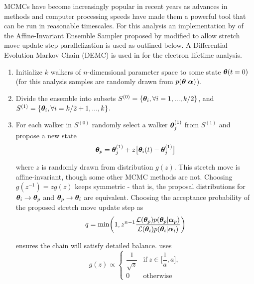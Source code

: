 MCMCs have become increasingly popular in recent years as advances in methods and computer processing speeds have made them
a powerful tool that can be run in reasonable timescales.  For this analysis an implementation by  of
the Affine-Invariant Ensemble Sampler proposed by  modified to allow stretch move update step parallelization is
used as outlined below.  A Differential Evolution Markov Chain (DEMC) is used in  for the electron
lifetime analysis.

\begin{enumerate}
\item Initialize $k$ walkers of $n$-dimensional parameter space to some state $\boldsymbol{\theta}(t = 0)$ (for this analysis samples are
randomly drawn from $p(\boldsymbol{\theta}|\boldsymbol{\alpha})$).

\item \label{itm:divide} Divide the ensemble into subsets $S^{(0)} = \{\boldsymbol{\theta}_i, \forall i = 1, . . ., k/2\}$, and
$S^{(1)} = \{\boldsymbol{\theta}_i, \forall i = k/2 + 1, . . ., k\}$.

\item \label{itm:newstate} For each walker in $S^{(0)}$ randomly select a walker $\boldsymbol{\theta}_j^{(1)}$ from $S^{(1)}$ and propose a new
state
\begin{equation}
\boldsymbol{\theta}_p = \boldsymbol{\theta}_j^{(1)} + z \big[ \boldsymbol{\theta}_i(t) - \boldsymbol{\theta}_j^{(1)} \big]
\label{eq:er_nr_calibrations_parameter_determ_mcmc_walker_update}
\end{equation}

\noindent where $z$ is randomly drawn from distribution $g(z)$. This stretch move is affine-invariant, though some other MCMC
methods are not.  Choosing
$g(z^{-1}) = z g(z)$ keeps  symmetric - that is, the proposal
distributions for $\boldsymbol{\theta}_i \rightarrow \boldsymbol{\theta}_p$ and $\boldsymbol{\theta}_p \rightarrow \boldsymbol{\theta}_i$ are
equivalent.  Choosing the
acceptance probability of the proposed stretch move update step as
\begin{equation}
q = \mathrm{min} \bigg( 1, z^{n - 1} \frac{\mathcal{L}(\boldsymbol{\theta}_p)p(\boldsymbol{\theta}_p|\boldsymbol{\alpha}_p)}
{\mathcal{L}(\boldsymbol{\theta}_i)p(\boldsymbol{\theta}_i|\boldsymbol{\alpha}_i)} \bigg)
\label{eq:er_nr_calibrations_parameter_determ_mcmc_prob}
\end{equation}

\noindent ensures the chain will satisfy detailed balance.   uses
\begin{equation}
g(z) \propto
\begin{cases}
\dfrac{1}{\sqrt{z}} & \mathrm{if}\ z \in \bigg[ \dfrac{1}{a}, a \bigg], \\
0 & \mathrm{otherwise}
\end{cases}
\end{equation}


\end{enumerate}
